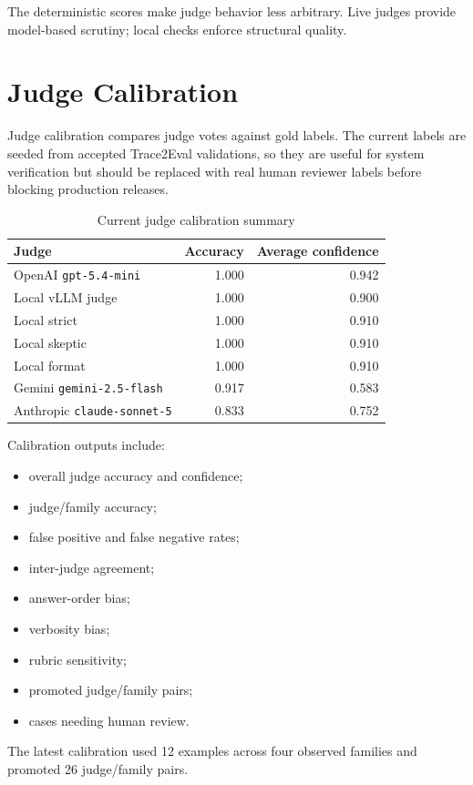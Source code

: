 \documentclass[11pt]{article}
\newcommand{\code}[1]{\texttt{#1}}
\begin{document}
The deterministic scores make judge behavior less arbitrary. Live judges provide model-based scrutiny; local checks enforce structural quality.

\section{Judge Calibration}

Judge calibration compares judge votes against gold labels. The current labels are seeded from accepted Trace2Eval validations, so they are useful for system verification but should be replaced with real human reviewer labels before blocking production releases.

\begin{table}[H]
\centering
\caption{Current judge calibration summary}
\begin{tabular}{lrr}
\toprule
Judge & Accuracy & Average confidence\\
\midrule
OpenAI \code{gpt-5.4-mini} & 1.000 & 0.942\\
Local vLLM judge & 1.000 & 0.900\\
Local strict & 1.000 & 0.910\\
Local skeptic & 1.000 & 0.910\\
Local format & 1.000 & 0.910\\
Gemini \code{gemini-2.5-flash} & 0.917 & 0.583\\
Anthropic \code{claude-sonnet-5} & 0.833 & 0.752\\
\bottomrule
\end{tabular}
\end{table}

Calibration outputs include:

\begin{itemize}
  \item overall judge accuracy and confidence;
  \item judge/family accuracy;
  \item false positive and false negative rates;
  \item inter-judge agreement;
  \item answer-order bias;
  \item verbosity bias;
  \item rubric sensitivity;
  \item promoted judge/family pairs;
  \item cases needing human review.
\end{itemize}

The latest calibration used 12 examples across four observed families and promoted 26 judge/family pairs.
\end{document}
